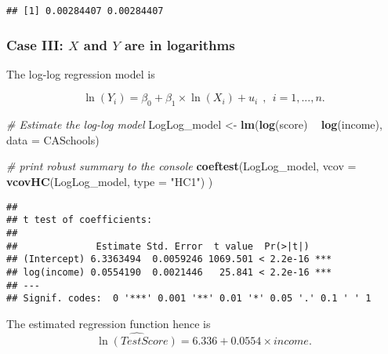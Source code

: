 \documentclass[]{book}
\newenvironment{Shaded}{\begin{snugshade}}{\end{snugshade}}
\newcommand{\KeywordTok}[1]{\textcolor[rgb]{0.13,0.29,0.53}{\textbf{#1}}}
\newcommand{\DataTypeTok}[1]{\textcolor[rgb]{0.13,0.29,0.53}{#1}}
\newcommand{\DecValTok}[1]{\textcolor[rgb]{0.00,0.00,0.81}{#1}}
\newcommand{\StringTok}[1]{\textcolor[rgb]{0.31,0.60,0.02}{#1}}
\newcommand{\CommentTok}[1]{\textcolor[rgb]{0.56,0.35,0.01}{\textit{#1}}}
\newcommand{\OperatorTok}[1]{\textcolor[rgb]{0.81,0.36,0.00}{\textbf{#1}}}
\newcommand{\NormalTok}[1]{#1}
\theoremstyle{definition}
\theoremstyle{definition}
\theoremstyle{definition}
\theoremstyle{remark}
\begin{document}
\begin{verbatim}
## [1] 0.00284407 0.00284407
\end{verbatim}

\subsubsection*{\texorpdfstring{Case III: \(X\) and \(Y\) are in
logarithms}{Case III: X and Y are in logarithms}}\label{case-iii-x-and-y-are-in-logarithms}

The log-log regression model is

\[\ln(Y_i) = \beta_0 + \beta_1 \times \ln(X_i) + u_i \ \ , \ \ i=1,...,n. \]

\begin{Shaded}
\begin{Highlighting}[]
\CommentTok{# Estimate the log-log model}
\NormalTok{LogLog_model <-}\StringTok{ }\KeywordTok{lm}\NormalTok{(}\KeywordTok{log}\NormalTok{(score) }\OperatorTok{~}\StringTok{ }\KeywordTok{log}\NormalTok{(income), }\DataTypeTok{data =}\NormalTok{ CASchools)}

\CommentTok{# print robust summary to the console}
\KeywordTok{coeftest}\NormalTok{(LogLog_model, }
         \DataTypeTok{vcov =} \KeywordTok{vcovHC}\NormalTok{(LogLog_model, }\DataTypeTok{type =} \StringTok{"HC1"}\NormalTok{)}
\NormalTok{         )}
\end{Highlighting}
\end{Shaded}

\begin{verbatim}
## 
## t test of coefficients:
## 
##              Estimate Std. Error  t value  Pr(>|t|)    
## (Intercept) 6.3363494  0.0059246 1069.501 < 2.2e-16 ***
## log(income) 0.0554190  0.0021446   25.841 < 2.2e-16 ***
## ---
## Signif. codes:  0 '***' 0.001 '**' 0.01 '*' 0.05 '.' 0.1 ' ' 1
\end{verbatim}

The estimated regression function hence is
\[\widehat{\ln(TestScore)} = 6.336 + 0.0554 \times income.\]

\begin{Shaded}
\end{Shaded}
\end{document}
